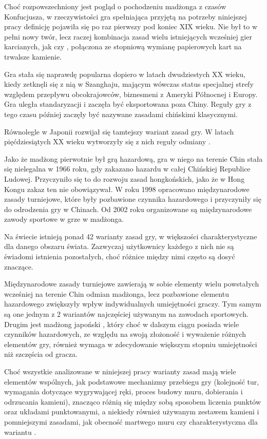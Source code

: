 \summary
Choć rozpowszechniony jest pogląd o pochodzeniu madżonga z czasów Konfucjusza, w
rzeczywistości gra spełniająca przyjętą na potrzeby niniejszej pracy definicję
pojawiła się po raz pierwszy pod koniec XIX wieku. Nie był to w pełni nowy
twór, lecz raczej kombinacja zasad wielu istniejących wcześniej gier karcianych,
jak  czy , połączona ze stopniową wymianę
papierowych kart na trwalsze kamienie.

Gra stała się naprawdę popularna dopiero w latach dwudziestych XX wieku, kiedy
zetknęli się z nią w Szanghaju, mającym wówczas status specjalnej strefy
względem przepływu obcokrajowców, biznesmeni z Ameryki Północnej i Europy. Gra
uległa standaryzacji i zaczęła być eksportowana poza Chiny. Reguły gry z tego
czasu później zaczęły być nazywane zasadami chińskimi klasycznymi. 

Równolegle w Japonii rozwijał się tamtejszy wariant zasad gry. W latach
pięćdziesiątych XX wieku wytworzyły się z nich reguły odmiany .

Jako że madżong pierwotnie był grą hazardową, gra w niego na terenie Chin stała
się nielegalna w 1966 roku, gdy zakazano hazardu w całej Chińskiej Republice
Ludowej. Przyczyniło się to do rozwoju zasad hongkońskich, jako że w Hong Kongu
zakaz ten nie obowiązywał. W roku 1998 opracowano międzynarodowe zasady turniejowe,
które były pozbawione czynnika hazardowego i przyczyniły się do odrodzenia gry w
Chinach. Od 2002 roku organizowane są międzynarodowe zawody sportowe
w grze w madżonga.

Na świecie istnieją ponad 42 warianty zasad gry, w większości charakterystyczne
dla danego obszaru świata. Zazwyczaj użytkownicy każdego z nich nie są świadomi
istnienia pozostałych, choć różnice między nimi często są dosyć znaczące.

Międzynarodowe zasady turniejowe zawierają w sobie elementy wielu powstałych
wcześniej na terenie Chin odmian madżonga, lecz pozbawione elementu hazardowego
zwiększyły wpływ indywidualnych umiejętności graczy. Tym samym są one jednym z 2
wariantów najczęściej używanym na zawodach sportowych. Drugim jest madżong
japoński , który choć w dalszym ciągu posiada wiele czynników
hazardowych, ze względu na swoją złożoność i wyważenie różnych elementów gry,
również wymaga w zdecydowanie większym stopniu umiejętności niż szczęścia od
gracza. 

Choć wszystkie analizowane w niniejszej pracy warianty zasad mają wiele
elementów wspólnych, jak podstawowe mechanizmy przebiegu gry (kolejność tur,
wymagania dotyczące wygrywającej ręki, proces budowy muru, dobierania i
odrzucania kamieni), znacząco różnią się między sobą sposobem liczenia punktów
oraz układami punktowanymi, a niekiedy również używanym zestawem kamieni i
pomniejszymi zasadami, jak obecność martwego muru czy charakterystyczna dla
wariantu  .

